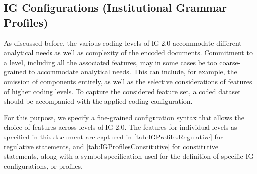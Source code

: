 \clearpairofpagestyles
\chead{\headmark}
\ifoot{\ifootertext}
\ofoot{\ofootertext}
\cfoot{\thepage}


\subsection{IG Configurations (Institutional Grammar Profiles)}
\label{subsec:IgProfiles}

As discussed before, the various coding levels of IG 2.0 accommodate different analytical needs as well as complexity of the encoded documents. Commitment to a level, including all the associated features, may in some cases be too coarse-grained to accommodate analytical needs. This can include, for example, the omission of components entirely, as well as the selective considerations of features of higher coding levels. To capture the considered feature set, a coded dataset should be accompanied with the applied coding configuration. 

For this purpose, we specify a fine-grained configuration syntax that allows the choice of features across levels of IG 2.0. The features for individual levels as specified in this document are captured in \cref{tab:IGProfilesRegulative} for regulative statements, and \cref{tab:IGProfilesConstitutive} for constitutive statements, along with a symbol specification used for the definition of specific IG configurations, or profiles.


